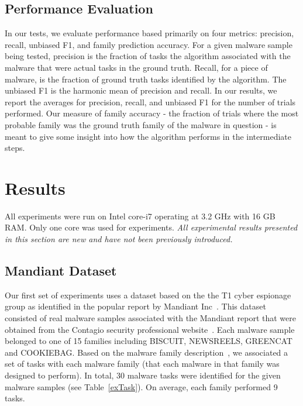 \documentclass[conference]{IEEEtran}
\begin{document}
\subsection{Performance Evaluation}
In our tests, we evaluate performance based primarily on four metrics: precision, recall, unbiased F1, and family prediction accuracy.  For a given malware sample being tested, precision is the fraction of tasks the algorithm associated with the malware that were actual tasks in the ground truth.  Recall, for a piece of malware, is the fraction of ground truth tasks identified by the algorithm.  The unbiased F1 is the harmonic mean of precision and recall.  In our results, we report the averages for precision, recall, and unbiased F1 for the number of trials performed.  Our measure of family accuracy - the fraction of trials where the most probable family was the ground truth family of the malware in question - is meant to give some insight into how the algorithm performs in the intermediate steps.

\section{Results}
\noindent All experiments were run on Intel core-i7 operating at 3.2 GHz with 16 GB RAM. Only one core was used for experiments. \textit{All experimental results presented in this section are new and have not been previously introduced.}
\label{expSec}
\subsection{Mandiant Dataset}
Our first set of experiments uses a dataset based on the the T1 cyber espionage group as identified in the popular report by Mandiant Inc~\cite{mandiant}.  This dataset consisted of  real malware samples associated with the Mandiant report that were obtained from the Contagio security professional website~\cite{apt1sams}.  Each malware sample belonged to one of 15 families including BISCUIT, NEWSREELS, GREENCAT and COOKIEBAG. Based on the malware family description~\cite{mandiant}, we associated a set of tasks with each malware family (that each malware in that family was designed to perform). In total, 30 malware tasks were identified for the given malware samples (see Table~\ref{exTask}). On average, each family performed 9 tasks.
\end{document}
